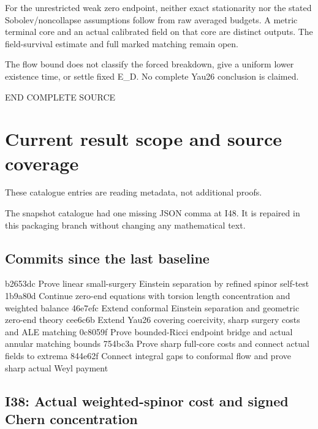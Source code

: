 \documentclass[
  10pt,
]{article}
\begin{document}
For the unrestricted weak zero endpoint, neither exact stationarity nor
the stated Sobolev/noncollapse assumptions follow from raw averaged
budgets. A metric terminal core and an actual calibrated field on that
core are distinct outputs. The field-survival estimate and full marked
matching remain open.

The flow bound does not classify the forced breakdown, give a uniform
lower existence time, or settle fixed E\_D. No complete Yau26 conclusion
is claimed.

END COMPLETE SOURCE

\hypertarget{current-result-scope-and-source-coverage}{%
\section{Current result scope and source
coverage}\label{current-result-scope-and-source-coverage}}

These catalogue entries are reading metadata, not additional proofs.

The snapshot catalogue had one missing JSON comma at I48. It is repaired
in this packaging branch without changing any mathematical text.

\hypertarget{commits-since-the-last-baseline}{%
\subsection{Commits since the last
baseline}\label{commits-since-the-last-baseline}}

b2653dc Prove linear small-surgery Einstein separation by refined spinor
self-test 1b9a80d Continue zero-end equations with torsion length
concentration and weighted balance 46e7efc Extend conformal Einstein
separation and geometric zero-end theory cee6c6b Extend Yau26 covering
coercivity, sharp surgery costs and ALE matching 0c8059f Prove
bounded-Ricci endpoint bridge and actual annular matching bounds 754bc3a
Prove sharp full-core costs and connect actual fields to extrema 844e62f
Connect integral gaps to conformal flow and prove sharp actual Weyl
payment

\hypertarget{i38-actual-weighted-spinor-cost-and-signed-chern-concentration}{%
\subsection{I38: Actual weighted-spinor cost and signed Chern
concentration}\label{i38-actual-weighted-spinor-cost-and-signed-chern-concentration}}
\end{document}
